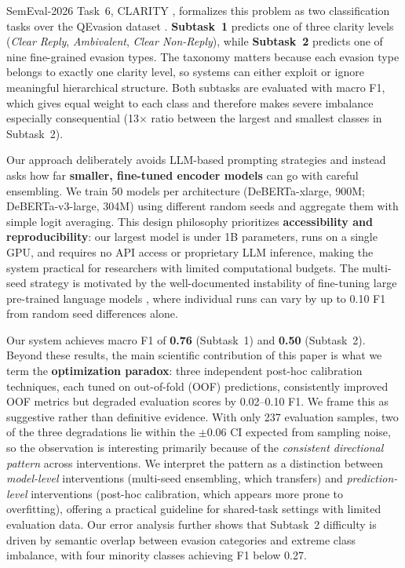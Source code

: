 \documentclass[11pt]{article}
\begin{document}
SemEval-2026 Task~6, CLARITY \citep{semeval2026task6}, formalizes this problem as two classification tasks over the QEvasion dataset \citep{thomas2024clarity}. \textbf{Subtask~1} predicts one of three clarity levels (\textit{Clear Reply}, \textit{Ambivalent}, \textit{Clear Non-Reply}), while \textbf{Subtask~2} predicts one of nine fine-grained evasion types. The taxonomy matters because each evasion type belongs to exactly one clarity level, so systems can either exploit or ignore meaningful hierarchical structure. Both subtasks are evaluated with macro F1, which gives equal weight to each class and therefore makes severe imbalance especially consequential (13$\times$ ratio between the largest and smallest classes in Subtask~2).

Our approach deliberately avoids LLM-based prompting strategies and instead asks how far \textbf{smaller, fine-tuned encoder models} can go with careful ensembling. We train 50 models per architecture (DeBERTa-xlarge, 900M; DeBERTa-v3-large, 304M) using different random seeds and aggregate them with simple logit averaging. This design philosophy prioritizes \textbf{accessibility and reproducibility}: our largest model is under 1B parameters, runs on a single GPU, and requires no API access or proprietary LLM inference, making the system practical for researchers with limited computational budgets. The multi-seed strategy is motivated by the well-documented instability of fine-tuning large pre-trained language models \citep{dodge2020finetuning}, where individual runs can vary by up to 0.10 F1 from random seed differences alone.

Our system achieves macro F1 of \textbf{0.76} (Subtask~1) and \textbf{0.50} (Subtask~2). Beyond these results, the main scientific contribution of this paper is what we term the \textbf{optimization paradox}: three independent post-hoc calibration techniques, each tuned on out-of-fold (OOF) predictions, consistently improved OOF metrics but degraded evaluation scores by 0.02--0.10 F1. We frame this as suggestive rather than definitive evidence. With only 237 evaluation samples, two of the three degradations lie within the $\pm$0.06 CI expected from sampling noise, so the observation is interesting primarily because of the \emph{consistent directional pattern} across interventions. We interpret the pattern as a distinction between \textit{model-level} interventions (multi-seed ensembling, which transfers) and \textit{prediction-level} interventions (post-hoc calibration, which appears more prone to overfitting), offering a practical guideline for shared-task settings with limited evaluation data. Our error analysis further shows that Subtask~2 difficulty is driven by semantic overlap between evasion categories and extreme class imbalance, with four minority classes achieving F1 below 0.27.
\end{document}
